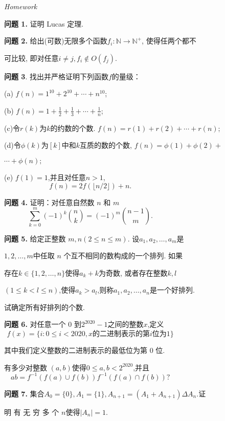\documentclass{article}
\begin{document}
\vspace*{3.2cm}
{\huge\hspace*{-1.5em} \textit{Homework}}\par
\vspace{1.5cm}
\textbf{问题 1.} 证明 Lucas 定理. 


\textbf{问题 2.} 给出(可数)无限多个函数$f_i:\mathbb{N}\to\mathbb{N}^+$, 使得任两个都不

可比较, 即对任意$i\neq j,f_i\notin O(f_j).$

\textbf{问题 3}. 找出并{\kaishu 严格}证明下列函数$f$的量级：

\quad(a) $f(n)=1^{10}+2^{10}+\cdots+n^{10}$;

\quad(b) $f(n)=1+\frac12+\frac13+\cdots+\frac1{n}$;

\quad(c)令$r(k)$为$k$的约数的个数. $f(n)=r(1)+r(2)+\cdots+r(n);$

\quad(d)令$\phi(k)$为$[k]$中和$k$互质的数的个数, $f(n)=\phi(1)+\phi(2)+$

$\cdots+\phi(n);$

\quad(e) $f(1)=1$,并且对任意$n>1$,
$$f(n)=2f(\lfloor n/2\rfloor)+n.\hspace{5cm}$$

\textbf{问题 4.} 证明：对任意自然数 $n$ 和 $m$
$$\sum_{k=0}^{m}(-1)^{k}\binom{n}{k}=(-1)^{m}\binom{n-1}{m}.\hspace{5cm}$$

\textbf{问题 5.} 给定正整数 $m,n(2\leq n\leq m)$. 设$a_1,a_2,\ldots,a_m$是

$1,2,\ldots,m$中任取 $n$ 个互不相同的数构成的一个排列. 如果

存在$k\in\{1,2,\ldots,n\}$使得$a_k+k$为奇数, 或者存在整数$k,l$

$(1\leq k<l\leq n)$,使得$a_k>a_l$,则称$a_1,a_2,\ldots,a_n$是一个好排列. 

试确定所有好排列的个数.

\textbf{问题 6.} 对任意一个 0 到$2^\mathrm{2020}-1$之间的整数$x$,定义
\[f(x)=\{i:0\leq i<2020,x\text{的二进制表示的第} i \text{位为} 1\}\hspace{5cm}\]

其中我们定义整数的二进制表示的最低位为第 0 位. 

有多少对整数  $( a, b)$使得$0\leq a,b<2^{2020}$,并且
$$ab=f^{-1}(f(a)\cup f(b))f^{-1}(f(a)\cap f(b))?\hspace{5cm}$$

\textbf{问题 7.} 集合$A_0=\{0\},A_1=\{1\},A_{n+1}=(A_1+A_{n+1})\Delta A_n$.证

明 有 无 穷 多 个  $n$使得$|A_n|=1$.
\end{document}
